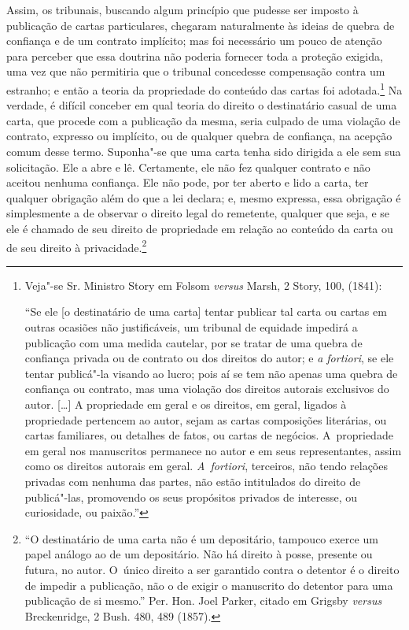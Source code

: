 Assim, os tribunais, buscando algum princípio que pudesse ser imposto à
publicação de cartas particulares, chegaram naturalmente às ideias de
quebra de confiança e de um contrato implícito; mas foi necessário um
pouco de atenção para perceber que essa doutrina não poderia fornecer
toda a proteção exigida, uma vez que não permitiria que o tribunal
concedesse compensação contra um estranho; e então a teoria da
propriedade do conteúdo das cartas foi adotada.\footnote{Veja"-se Sr.
  Ministro Story em Folsom \emph{versus} Marsh, 2 Story, 100, 
  (1841):

  ``Se ele {[}o destinatário de uma carta{]} tentar publicar tal carta
  ou cartas em outras ocasiões não justificáveis, um tribunal de
  equidade impedirá a publicação com uma medida cautelar, por se tratar
  de uma quebra de confiança privada ou de contrato ou dos direitos do
  autor; e \emph{a fortiori}, se ele tentar publicá"-la visando ao lucro;
  pois aí se tem não apenas uma quebra de confiança ou contrato, mas uma
  violação dos direitos autorais exclusivos do autor. {[}\ldots{}{]} A
  propriedade em geral e os direitos, em geral, ligados à propriedade
  pertencem ao autor, sejam as cartas composições literárias, ou cartas
  familiares, ou detalhes de fatos, ou cartas de negócios. A~propriedade
  em geral nos manuscritos permanece no autor e em seus representantes,
  assim como os direitos autorais em geral. \emph{A~fortiori},
  terceiros, não tendo relações privadas com nenhuma das partes, não
  estão intitulados do direito de publicá"-las, promovendo os seus
  propósitos privados de interesse, ou curiosidade, ou paixão.''} Na
verdade, é difícil conceber em qual teoria do direito o destinatário
casual de uma carta, que procede com a publicação da mesma, seria
culpado de uma violação de contrato, expresso ou implícito, ou de
qualquer quebra de confiança, na acepção comum desse termo. Suponha"-se
que uma carta tenha sido dirigida a ele sem sua solicitação. Ele a abre
e lê. Certamente, ele não fez qualquer contrato e não aceitou nenhuma
confiança. Ele não pode, por ter aberto e lido a carta, ter qualquer
obrigação além do que a lei declara; e, mesmo expressa, essa obrigação é
simplesmente a de observar o direito legal do remetente, qualquer que
seja, e se ele é chamado de seu direito de propriedade em relação ao
conteúdo da carta ou de seu direito à privacidade.\footnote{``O
  destinatário de uma carta não é um depositário, tampouco exerce um
  papel análogo ao de um depositário. Não há direito à posse, presente
  ou futura, no autor. O~único direito a ser garantido contra o detentor
  é o direito de impedir a publicação, não o de exigir o manuscrito do
  detentor para uma publicação de si mesmo.'' Per. Hon. Joel Parker,
  citado em Grigsby \emph{versus} Breckenridge, 2 Bush. 480, 489 (1857).}

